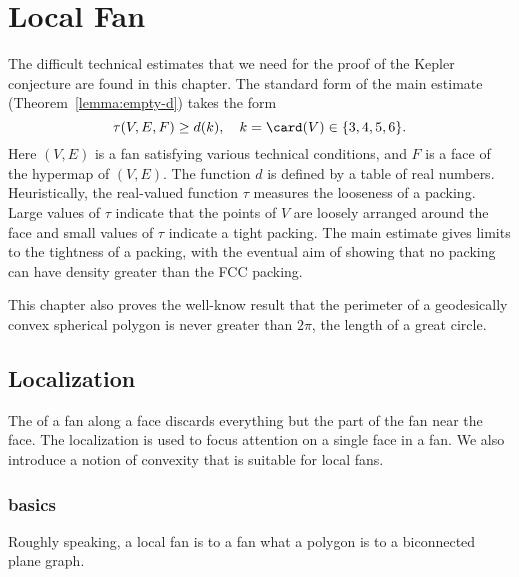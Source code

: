 

\chapter{Local Fan}\label{sec:local}



\begin{summary}
  The difficult technical estimates that we need for the proof of the
  Kepler conjecture are found in this chapter.  The standard form
of the main estimate
  (Theorem~\ref{lemma:empty-d}) takes the form
\begin{equation}\label{eqn:main}
\tau(V,E,F) \ge d(k),\quad k= \card(V)\in \{3,4,5,6\}.
\end{equation}
Here $(V,E)$ is a fan satisfying various technical conditions, and $F$
is a face of the hypermap of $(V,E)$.  The function $d$ is defined by
a table of real numbers.  Heuristically, the real-valued
function $\tau$ measures the looseness of a packing.  Large values of
$\tau$ indicate that the points of $V$ are loosely arranged around the
face and small values of $\tau$ indicate a tight packing.  The main
estimate gives limits to the tightness of a packing, with the eventual
aim of showing that no packing can have density greater than the FCC
packing.  

This chapter also proves the well-know result that the perimeter of a
geodesically convex spherical polygon is never greater than $2\pi$,
the length of a great circle.
\end{summary}


\section{Localization}

The  of a fan along
a face discards everything but the part of the fan near the face.  
The localization is used to focus attention on a single face
in a fan.  
We also introduce a notion of convexity that is suitable for local fans.

\subsection{basics}

Roughly speaking,
a local fan is to a fan what a polygon is to a biconnected plane graph.  


